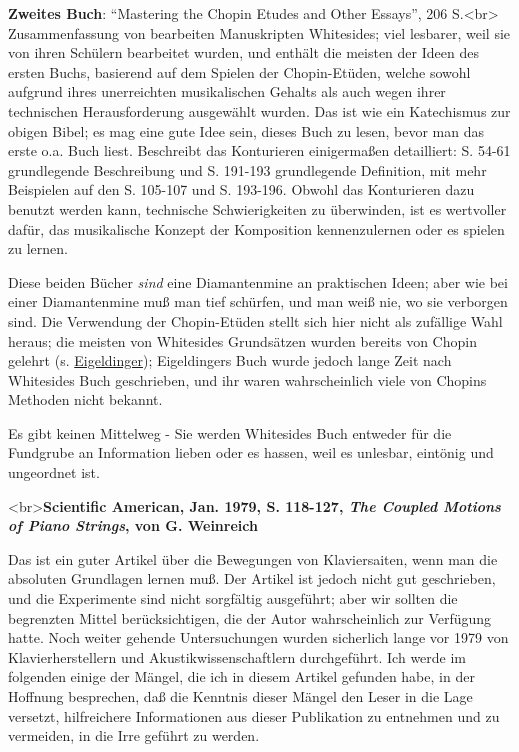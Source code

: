 \textbf{Zweites Buch}: \enquote{Mastering the Chopin Etudes and Other Essays}, 206 S.<br>
Zusammenfassung von bearbeiten Manuskripten Whitesides; viel lesbarer, weil sie von ihren Schülern bearbeitet wurden, und enthält die meisten der Ideen des ersten Buchs, basierend auf dem Spielen der Chopin-Etüden, welche sowohl aufgrund ihres unerreichten musikalischen Gehalts als auch wegen ihrer technischen Herausforderung ausgewählt wurden.
Das ist wie ein Katechismus zur obigen Bibel; es mag eine gute Idee sein, dieses Buch zu lesen, bevor man das erste o.a. Buch liest.
Beschreibt das Konturieren einigermaßen detailliert: S. 54-61 grundlegende Beschreibung und S. 191-193 grundlegende Definition, mit mehr Beispielen auf den S. 105-107 und S. 193-196.
Obwohl das Konturieren dazu benutzt werden kann, technische Schwierigkeiten zu überwinden, ist es wertvoller dafür, das musikalische Konzept der Komposition kennenzulernen oder es spielen zu lernen.

Diese beiden Bücher \textit{sind} eine Diamantenmine an praktischen Ideen; aber wie bei einer Diamantenmine muß man tief schürfen, und man weiß nie, wo sie verborgen sind.
Die Verwendung der Chopin-Etüden stellt sich hier nicht als zufällige Wahl heraus; die meisten von Whitesides Grundsätzen wurden bereits von Chopin gelehrt (s. \hyperref[Eigeldinger]{Eigeldinger}); Eigeldingers Buch wurde jedoch lange Zeit nach Whitesides Buch geschrieben, und ihr waren wahrscheinlich viele von Chopins Methoden nicht bekannt.

Es gibt keinen Mittelweg - Sie werden Whitesides Buch entweder für die Fundgrube an Information lieben oder es hassen, weil es unlesbar, eintönig und ungeordnet ist.
 

\label{American}

<br>\textbf{Scientific American, Jan. 1979, S. 118-127, \textit{The Coupled Motions of Piano Strings}, von G. Weinreich}

Das ist ein guter Artikel über die Bewegungen von Klaviersaiten, wenn man die absoluten Grundlagen lernen muß.
Der Artikel ist jedoch nicht gut geschrieben, und die Experimente sind nicht sorgfältig ausgeführt; aber wir sollten die begrenzten Mittel berücksichtigen, die der Autor wahrscheinlich zur Verfügung hatte.
Noch weiter gehende Untersuchungen wurden sicherlich lange vor 1979 von Klavierherstellern und Akustikwissenschaftlern durchgeführt.
Ich werde im folgenden einige der Mängel, die ich in diesem Artikel gefunden habe, in der Hoffnung besprechen, daß die Kenntnis dieser Mängel den Leser in die Lage versetzt, hilfreichere Informationen aus dieser Publikation zu entnehmen und zu vermeiden, in die Irre geführt zu werden.

